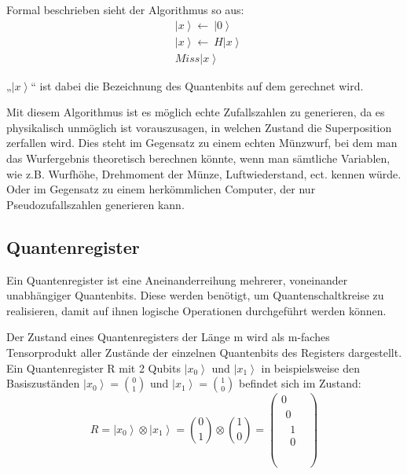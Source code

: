 Formal beschrieben sieht der Algorithmus so aus:
\begin{align*}
    &\left|x\right\rangle \gets\ \left|0\right\rangle  \\
    &\left|x\right\rangle \gets\ H\left|x\right\rangle \\
    &Miss\left|x\right\rangle
\end{align*}

	
„$\left|x\right\rangle$“ ist dabei die Bezeichnung des Quantenbits auf dem gerechnet wird.

Mit diesem Algorithmus ist es möglich echte Zufallszahlen zu generieren, da es physikalisch unmöglich ist vorauszusagen, in welchen Zustand die Superposition zerfallen wird. Dies steht im Gegensatz zu einem echten Münzwurf, bei dem man das Wurfergebnis theoretisch berechnen könnte, wenn man sämtliche Variablen, wie z.B. Wurfhöhe, Drehmoment der Münze, Luftwiederstand, ect. kennen würde. Oder im Gegensatz zu einem herkömmlichen Computer, der nur Pseudozufallszahlen generieren kann. 
\subsection{Quantenregister}

Ein Quantenregister ist eine Aneinanderreihung mehrerer, voneinander unabhängiger Quantenbits. Diese werden benötigt, um Quantenschaltkreise zu realisieren, damit auf ihnen logische Operationen durchgeführt werden können. 

Der Zustand eines Quantenregisters der Länge m wird als m-faches Tensorprodukt aller Zustände der einzelnen Quantenbits des Registers dargestellt. Ein Quantenregister R mit 2 Qubits $\left|\left.x_0\right\rangle\right.$ und $\left|\left.x_1\right\rangle\right.$ in beispielsweise den Basiszuständen $\left|\left.x_0\right\rangle\right.=\binom{0}{1}$ und $\left|\left.x_1\right\rangle\right.=\binom{1}{0}$ befindet sich im Zustand:
$$R=\left|\left.x_0\right\rangle\right.\otimes\left|\left.x_1\right\rangle\right.=\binom{0}{1}\otimes\binom{1}{0}=\left(\begin{matrix}0\\\begin{matrix}0\\\begin{matrix}1\\0\\\end{matrix}\\\end{matrix}\\\end{matrix}\right)$$

